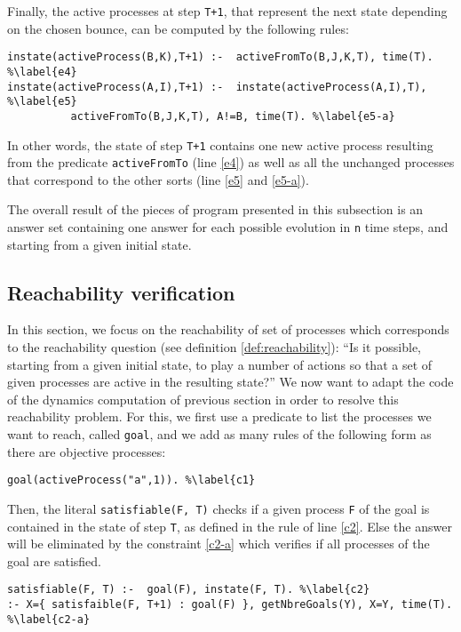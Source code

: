 Finally, the active processes at step \texttt{T+1},
that represent the next state depending on the chosen bounce,
can be computed by the following rules:
\begin{lstlisting}
instate(activeProcess(B,K),T+1) :-  activeFromTo(B,J,K,T), time(T). %\label{e4}
instate(activeProcess(A,I),T+1) :-  instate(activeProcess(A,I),T), %\label{e5}
          activeFromTo(B,J,K,T), A!=B, time(T). %\label{e5-a}
\end{lstlisting}
In other words, the state of step \texttt{T+1} contains one new active process
resulting from the predicate \texttt{activeFromTo} (line \ref{e4})
as well as all the unchanged processes that correspond to the other sorts (line \ref{e5} and \ref{e5-a}).

The overall result of the pieces of program presented in this subsection
is an answer set containing one answer for each
possible evolution in \texttt{n} time steps,
and starting from a given initial state.

\subsection{Reachability verification}
In this section, we focus on the reachability of set of processes which corresponds to the reachability question (see definition \ref{def:reachability}):
“Is it possible, starting from a given initial state, to play a number of actions so that a set of given processes are active in the resulting state?”
We now want to adapt the code of the dynamics computation of previous section in order to resolve this reachability problem.
For this, we first use a predicate to list the processes we want to reach, called \texttt{goal}, and we add as many rules of the following form as there are objective processes:
\begin{lstlisting}
goal(activeProcess("a",1)). %\label{c1}
\end{lstlisting}
Then, the literal \texttt{satisfiable(F, T)} 
checks if a given process \texttt{F} of the goal
is contained in the state of step \texttt{T},
as defined in the rule of line \ref{c2}.
Else the answer will be eliminated by the constraint \ref{c2-a} which verifies if all processes of the goal are satisfied.
\begin{lstlisting}
satisfiable(F, T) :-  goal(F), instate(F, T). %\label{c2}
:- X={ satisfaible(F, T+1) : goal(F) }, getNbreGoals(Y), X=Y, time(T). %\label{c2-a}
\end{lstlisting}


